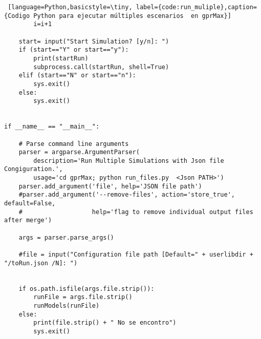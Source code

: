 \begin{lstlisting} [language=Python,basicstyle=\tiny, label={code:run_muliple},caption= {Codigo Python para ejecutar múltiples escenarios  en gprMax}]
        i=i+1

    start= input("Start Simulation? [y/n]: ")
    if (start=="Y" or start=="y"):
        print(startRun)
        subprocess.call(startRun, shell=True)
    elif (start=="N" or start=="n"):
        sys.exit()
    else:
        sys.exit()


if __name__ == "__main__":

    # Parse command line arguments
    parser = argparse.ArgumentParser(
        description='Run Multiple Simulations with Json file Congiguration.',
        usage='cd gprMax; python run_files.py  <Json PATH>')
    parser.add_argument('file', help='JSON file path')
    #parser.add_argument('--remove-files', action='store_true', default=False,
    #                   help='flag to remove individual output files after merge')

    args = parser.parse_args()

    #file = input("Configuration file path [Default=" + userlibdir + "/toRun.json /N]: ")


    if os.path.isfile(args.file.strip()):
        runFile = args.file.strip()
        runModels(runFile)
    else:
        print(file.strip() + " No se encontro")
        sys.exit()

\end{lstlisting}

\newpage


